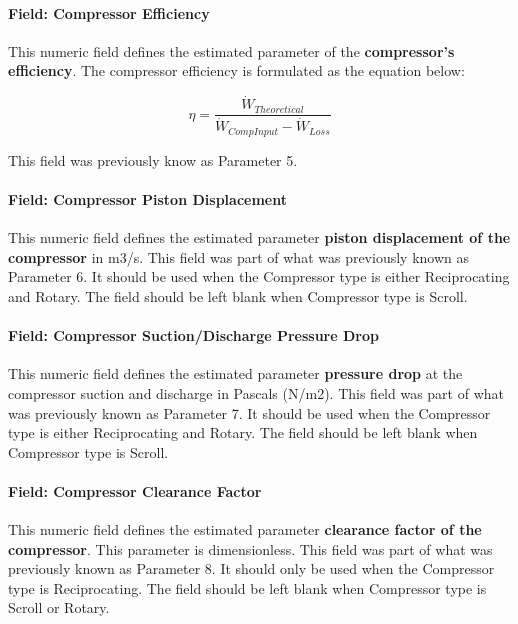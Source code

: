 \paragraph{Field: Compressor Efficiency}\label{field-compressor-efficiency}

This numeric field defines the estimated parameter of the \textbf{compressor's efficiency}. The compressor efficiency is formulated as the equation below:

\begin{equation}
\eta  = \frac{{{{\dot W}_{Theoretical}}}}{{{{\dot W}_{CompInput}} - {{\dot W}_{Loss}}}}
\end{equation}

This field was previously know as Parameter 5.

\paragraph{Field: Compressor Piston Displacement}\label{field-compressor-piston-displacement}

This numeric field defines the estimated parameter \textbf{piston displacement of the compressor} in m3/s. This field was part of what was previously known as Parameter 6. It should be used when the Compressor type is either Reciprocating and Rotary. The field should be left blank when Compressor type is Scroll.

\paragraph{Field: Compressor Suction/Discharge Pressure Drop}\label{field-compressor-suctiondischarge-pressure-drop}

This numeric field defines the estimated parameter \textbf{pressure drop} at the compressor suction and discharge in Pascals (N/m2). This field was part of what was previously known as Parameter 7. It should be used when the Compressor type is either Reciprocating and Rotary. The field should be left blank when Compressor type is Scroll.

\paragraph{Field: Compressor Clearance Factor}\label{field-compressor-clearance-factor}

This numeric field defines the estimated parameter \textbf{clearance factor of the compressor}. This parameter is dimensionless. This field was part of what was previously known as Parameter 8. It should only be used when the Compressor type is Reciprocating. The field should be left blank when Compressor type is Scroll or Rotary.


